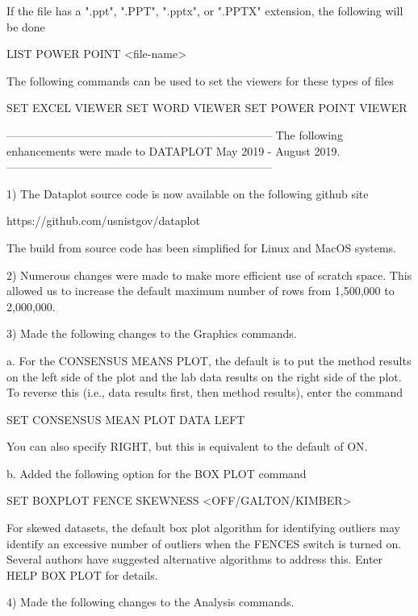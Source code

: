               If the file has a ".ppt", ".PPT", ".pptx", or ".PPTX"
              extension, the following will be done

                  LIST POWER POINT  <file-name>

              The following commands can be used to set the viewers
              for these types of files

                  SET EXCEL VIEWER
                  SET WORD VIEWER
                  SET POWER POINT VIEWER

-----------------------------------------------------------------------
The following enhancements were made to DATAPLOT
May 2019 - August 2019.
-----------------------------------------------------------------------

 1) The Dataplot source code is now available on the following
    github site

        https://github.com/usnistgov/dataplot

    The build from source code has been simplified for Linux and
    MacOS systems.

 2) Numerous changes were made to make more efficient use of scratch
    space.  This allowed us to increase the default maximum number of
    rows from 1,500,000 to 2,000,000.

 3) Made the following changes to the Graphics commands.

      a. For the CONSENSUS MEANS PLOT, the default is to put the method
         results on the left side of the plot and the lab data results
         on the right side of the plot.  To reverse this (i.e., data
         results first, then method results), enter the command

            SET CONSENSUS MEAN PLOT DATA LEFT

         You can also specify RIGHT, but this is equivalent to the
         default of ON.

      b. Added the following option for the BOX PLOT command

            SET BOXPLOT FENCE SKEWNESS <OFF/GALTON/KIMBER>

         For skewed datasets, the default box plot algorithm for
         identifying outliers may identify an excessive number of
         outliers when the FENCES switch is turned on.  Several
         authors have suggested alternative algorithms to address
         this.  Enter HELP BOX PLOT for details.

 4) Made the following changes to the Analysis commands.

